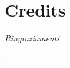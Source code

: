 \cleardoublepage
{}
\thispagestyle{empty}


\begingroup
\let\clearpage\relax
\let\cleardoublepage\relax
\let\cleardoublepage\relax

\section*{Credits}

\noindent \textit{Ringraziamenti}\\
\bigskip

\noindent\textit{\myLocation, \myTime}
\hfill \myName

\endgroup
